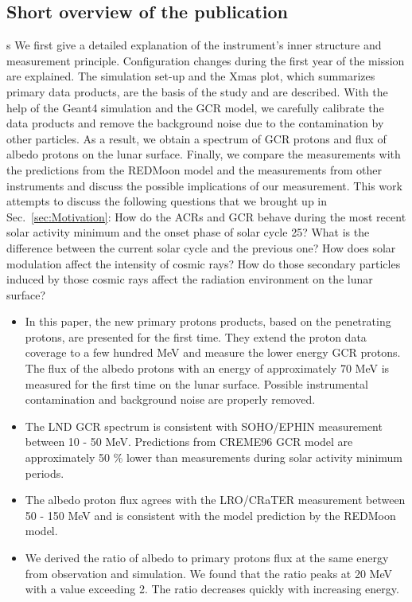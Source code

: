 \subsection*{Short overview of the publication}
s
We first give a detailed explanation of the instrument's inner structure and measurement principle. Configuration changes during the first year of the mission are explained. The simulation set-up and the Xmas plot, which summarizes primary data products, are the basis of the study and are described.
With the help of the \ac{Geant4} simulation and the \ac{GCR} model, we carefully calibrate the data products and remove the background noise due to the contamination by other particles. As a result, we obtain a spectrum of \ac{GCR} protons and flux of albedo protons on the lunar surface. Finally, we compare the measurements with the predictions from the \ac{REDMoon} model and the measurements from other instruments and discuss the possible implications of our measurement.
This work attempts to discuss the following questions that we brought up in Sec.~\ref{sec:Motivation}: 
How do the \acp{ACR} and \ac{GCR} behave during the most recent solar activity minimum and the onset phase of solar cycle 25? What is the difference between the current solar cycle and the previous one? How does solar modulation affect the intensity of cosmic rays? How do those secondary particles induced by those cosmic rays affect the radiation environment on the lunar surface?


\begin{itemize}
    \item   In this paper, the new primary protons products, based on the penetrating protons, are presented for the first time. They extend the proton data coverage to a few hundred MeV and measure the lower energy \ac{GCR} protons. The flux of the albedo protons with an energy of approximately 70 MeV is measured for the first time on the lunar surface. Possible instrumental contamination and background noise are properly removed.
    \item The \ac{LND} \ac{GCR} spectrum is consistent with \ac{SOHO}/\ac{EPHIN} measurement between 10 - 50 MeV.  Predictions from CREME96 \citep{Tylka1997ITNS} \ac{GCR} model are approximately 50 \% lower than measurements during solar activity minimum periods.
    \item  The albedo proton flux agrees with the \ac{LRO}/\ac{CRaTER} measurement between 50 - 150 MeV and is consistent with the model prediction by the \ac{REDMoon} model.
    \item We derived the ratio of albedo to primary protons flux at the same energy from observation and simulation. We found that the ratio peaks at 20 MeV with a value exceeding 2. The ratio decreases quickly with increasing energy.
\end{itemize}




